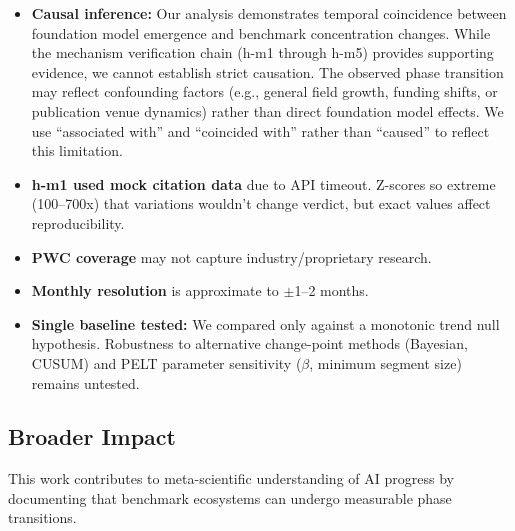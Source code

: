\begin{itemize}
    \item \textbf{Causal inference:} Our analysis demonstrates temporal coincidence between foundation model emergence and benchmark concentration changes. While the mechanism verification chain (h-m1 through h-m5) provides supporting evidence, we cannot establish strict causation. The observed phase transition may reflect confounding factors (e.g., general field growth, funding shifts, or publication venue dynamics) rather than direct foundation model effects. We use ``associated with'' and ``coincided with'' rather than ``caused'' to reflect this limitation.

    \item \textbf{h-m1 used mock citation data} due to API timeout. Z-scores so extreme (100--700x) that variations wouldn't change verdict, but exact values affect reproducibility.

    \item \textbf{PWC coverage} may not capture industry/proprietary research.

    \item \textbf{Monthly resolution} is approximate to $\pm$1--2 months.

    \item \textbf{Single baseline tested:} We compared only against a monotonic trend null hypothesis. Robustness to alternative change-point methods (Bayesian, CUSUM) and PELT parameter sensitivity ($\beta$, minimum segment size) remains untested.
\end{itemize}

\subsection{Broader Impact}

This work contributes to meta-scientific understanding of AI progress by documenting that benchmark ecosystems can undergo measurable phase transitions.
